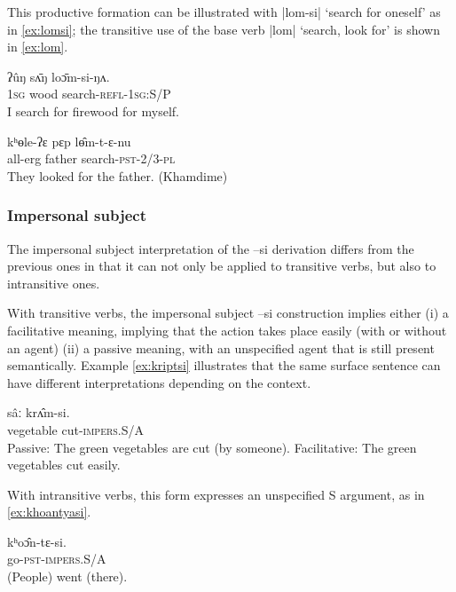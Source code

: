 \documentclass[twoside,a4paper,11pt]{article}
\newcommand{\ipa}[1]{{\phon#1}}
\begin{document}
This  productive formation can be illustrated with |\ipa{lom-si}| `search for oneself' as in \ref{ex:lomsi}; the transitive use of the base verb |\ipa{lom}| `search, look for' is shown in \ref{ex:lom}.

\begin{exe}
\ex \label{ex:lomsi} 
\gll
\ipa{ʔûŋ}  	\ipa{sʌ̄ŋ}  	\ipa{loɔ̄m-si-ŋʌ.}  \\
\textsc{1sg} wood search-\textsc{refl-1sg:S/P} \\
\glt I search for firewood for myself.
 \end{exe}
 
 \begin{exe}
\ex \label{ex:lom} 
\gll
 \ipa{kʰɵle-ʔɛ}  	\ipa{pɛp}  	\ipa{lɵ̂m-t-ɛ-nu}  \\
 all-erg father search-\textsc{pst-2/3-pl} \\
 \glt They looked for the father. (Khamdime)
 \end{exe}
 

\subsubsection{Impersonal subject} 
The impersonal subject interpretation of the \ipa{--si} derivation differs from the previous ones in that it can not only be applied to transitive verbs, but also to intransitive ones.

With transitive verbs, the impersonal subject \ipa{--si} construction implies either  (i) a facilitative meaning, implying that the action takes place easily (with or without an agent) (ii) a passive meaning, with an unspecified agent that is still present semantically. Example \ref{ex:kriptsi} illustrates that the same surface sentence can have different interpretations depending on the context. 
   
   \begin{exe}
\ex \label{ex:kriptsi} 
\gll 
 \ipa{sâː}  	\ipa{krʌ̂m-si.}  \\
 vegetable cut-\textsc{impers.S/A} \\
\glt Passive: The green vegetables are cut (by someone).
\glt Facilitative: The green vegetables cut easily.
\end{exe}
 
 With intransitive verbs, this form expresses an unspecified S argument, as in \ref{ex:khoantyasi}.
 
    \begin{exe}
\ex \label{ex:khoantyasi} 
\gll 
 \ipa{kʰoɔ̂n-tɛ-si.}  \\
go-\textsc{pst-impers.S/A} \\
\glt (People) went (there).
\end{exe}
\end{document}
